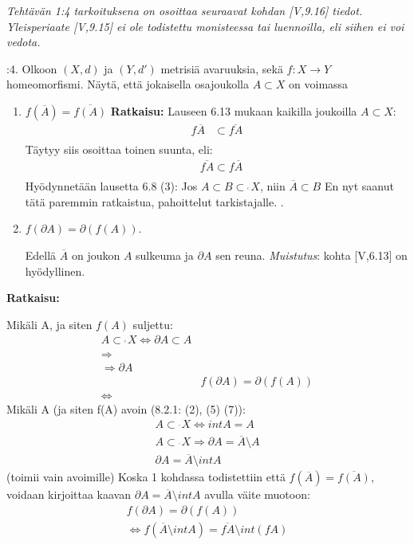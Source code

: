 \documentclass[12pt,a4paper,leqno]{amsart}
\newcommand{\css}{\operatorname{\subset\!\!\!\!_{^{^c}}}}
\newcommand{\oss}{\operatorname{\subset\!\!\!\!_{^{^\circ}}}}
\begin{document}
\bigskip

\textit{Tehtävän 1:4  tarkoituksena on  osoittaa seuraavat kohdan [V,9.16]  tiedot. 
Yleisperiaate [V,9.15] ei ole todistettu monisteessa tai luennoilla, eli siihen ei voi vedota.}

\bigskip

:4. Olkoon $(X,d)$ ja $(Y,d')$ metrisiä avaruuksia, sekä 
$f: X \to Y$ homeomorfismi. 
Näytä, että jokaisella osajoukolla  $A \subset X$ on voimassa 

\begin{enumerate}
\item $f(\overline{A}) = \overline{f(A)}$
\textbf{Ratkaisu: }
Lauseen 6.13 mukaan kaikilla joukoilla $A \subset X$:
\begin{align*}
f\overline{A} & \subset \overline{fA} \\
\end{align*}
Täytyy siis osoittaa toinen suunta, eli:
\begin{align*}
& \overline{fA} \subset f\overline{A}  \\
& 
\end{align*}
Hyödynnetään lausetta 6.8 (3):
Jos $A \subset B \css X$, niin $\overline{A} \subset B$
En nyt saanut tätä paremmin ratkaistua, pahoittelut tarkistajalle.
.
\smallskip

\item $f(\partial A) = \partial (f(A))$.

Edellä $\overline{A}$ on joukon $A$ sulkeuma ja $\partial A$ sen reuna.  \textit{Muistutus}: kohta [V,6.13] on hyödyllinen.

\end{enumerate}
\textbf{Ratkaisu:}

Mikäli A, ja siten $f(A)$ suljettu:
\begin{align*}
    A \css X \iff \partial A \subset A  \\
    \Rightarrow \\
    \Rightarrow \partial A \\
     &f(\partial A) = \partial (f(A)) \\
    \iff & 
\end{align*}
Mikäli A (ja siten f(A) avoin (8.2.1: (2), (5) (7)):
\begin{align*}
    A \oss X \iff int A = A \\
    A \oss X \Rightarrow \partial A = \overline{A} \setminus A \\
    \partial A = \overline{A} \setminus intA
\end{align*}
(toimii vain avoimille)
Koska 1 kohdassa todistettiin että $f(\overline{A}) = \overline{f(A)}$, voidaan kirjoittaa kaavan $\partial A = \overline{A} \setminus intA$ avulla väite muotoon: 
\begin{align*}
    f(\partial A) = \partial (f(A)) \\
\iff f(\overline{A} \setminus int A) = \overline{fA} \setminus int(fA) \\
\end{align*}
\end{document}
